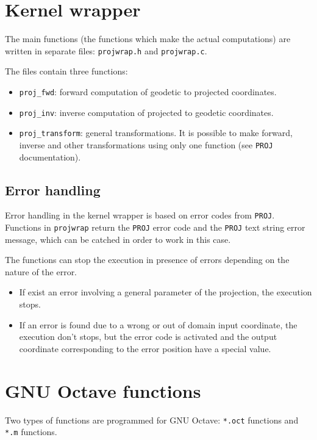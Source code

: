 \documentclass[10pt,a4paper]{article}
\newcommand{\proj}{\texttt{PROJ}}
\newcommand{\octave}{GNU Octave}
\begin{document}
\section{Kernel wrapper}
\label{op-kw}

The main functions (the functions which make the actual computations) are
written in separate files: \texttt{projwrap.h} and \texttt{projwrap.c}.

The files contain three functions:
\begin{itemize}
\item \texttt{proj\_fwd}: forward computation of geodetic to projected
      coordinates.
\item \texttt{proj\_inv}: inverse computation of projected to geodetic
      coordinates.
\item \texttt{proj\_transform}: general transformations. It is possible to make
      forward, inverse and other transformations using only one function (see
      \proj{} documentation).
\end{itemize}

\subsection{Error handling}

Error handling in the kernel wrapper is based on error codes from \proj.
Functions in \texttt{projwrap} return the \proj{} error code and the \proj{}
text string error message, which can be catched in order to work in this case.

The functions can stop the execution in presence of errors depending on the
nature of the error.
\begin{itemize}
\item If exist an error involving a general parameter of the projection, the
      execution stops.
\item If an error is found due to a wrong or out of domain input coordinate, the
      execution don't stops, but the error code is activated and the output
      coordinate corresponding to the error position have a special value.
\end{itemize}

\section{\octave{} functions}

Two types of functions are programmed for \octave: \texttt{*.oct} functions and
\texttt{*.m} functions.
\end{document}
